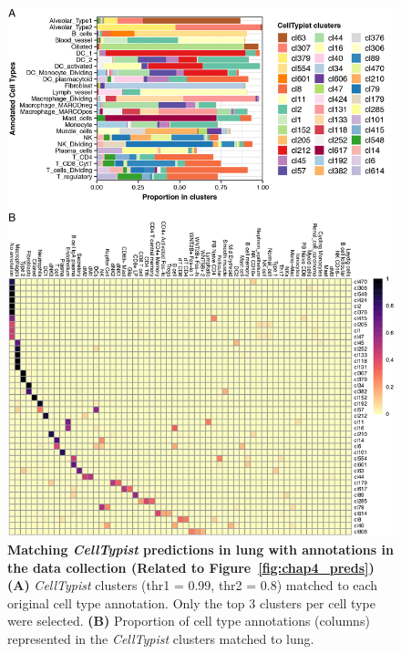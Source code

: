 \begin{figure}[pht!] 
\centering
\includegraphics[scale=0.93]{Appendix2/Figs/appB_lung_labs_exp.png} %
\caption[Matching \textit{CellTypist} predictions in lung with annotations in the data collection]{\textbf{Matching \textit{CellTypist} predictions in lung with annotations in the data collection (Related to Figure~\ref{fig:chap4_preds})}\newline\textbf{(A)} \textit{CellTypist} clusters (thr1 = 0.99, thr2 = 0.8) matched to each original cell type annotation. Only the top 3 clusters per cell type were selected. \textbf{(B)} Proportion of cell type annotations (columns) represented in the \textit{CellTypist} clusters matched to lung.}
\label{fig:appB_lunglabs}
\end{figure}


